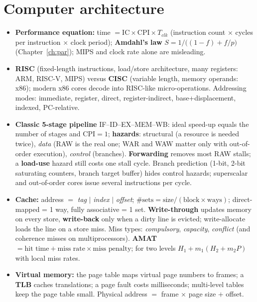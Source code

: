 \documentclass[10pt,a4paper,openany,oneside]{report}
\newcommand{\prio}[1]{\texorpdfstring{\ifcase#1\or{\color{gold}\ding{72}}\or{\color{gold}\ding{72}\ding{72}}\or{\color{gold}\ding{72}\ding{72}\ding{72}}\fi}{}}
\begin{document}
\section{Computer architecture \prio{3}}
\begin{mustbox}
\begin{itemize}[nosep]
\item \textbf{Performance equation:} time $=\text{IC}\times\text{CPI}\times T_{clk}$ (instruction count $\times$ cycles per instruction $\times$ clock period); \textbf{Amdahl's law} $S=1/\big((1-f)+f/p\big)$ (Chapter~\ref{ch:par}); MIPS and clock rate alone are misleading.
\item \textbf{RISC} (fixed-length instructions, load/store architecture, many registers: ARM, RISC-V, MIPS) versus \textbf{CISC} (variable length, memory operands: x86); modern x86 cores decode into RISC-like micro-operations. Addressing modes: immediate, register, direct, register-indirect, base+displacement, indexed, PC-relative.
\item \textbf{Classic 5-stage pipeline} IF--ID--EX--MEM--WB: ideal speed-up equals the number of stages and CPI$=1$; \textbf{hazards}: structural (a resource is needed twice), \emph{data} (RAW is the real one; WAR and WAW matter only with out-of-order execution), \emph{control} (branches). \textbf{Forwarding} removes most RAW stalls; a \textbf{load-use} hazard still costs one stall cycle. Branch prediction (1-bit, 2-bit saturating counters, branch target buffer) hides control hazards; superscalar and out-of-order cores issue several instructions per cycle.
\item \textbf{Cache:} address $=$ \emph{tag} $|$ \emph{index} $|$ \emph{offset}; $\#\text{sets}=\text{size}/(\text{block}\times\text{ways})$; direct-mapped = 1 way, fully associative = 1 set. \textbf{Write-through} updates memory on every store, \textbf{write-back} only when a dirty line is evicted; write-allocate loads the line on a store miss. Miss types: \emph{compulsory}, \emph{capacity}, \emph{conflict} (and coherence misses on multiprocessors). \textbf{AMAT} $=\text{hit time}+\text{miss rate}\times\text{miss penalty}$; for two levels $H_1+m_1(H_2+m_2P)$ with local miss rates.
\item \textbf{Virtual memory:} the page table maps virtual page numbers to frames; a \textbf{TLB} caches translations; a page fault costs milliseconds; multi-level tables keep the page table small. Physical address $=$ frame $\times$ page size $+$ offset.
\end{itemize}
\end{mustbox}
\end{document}
